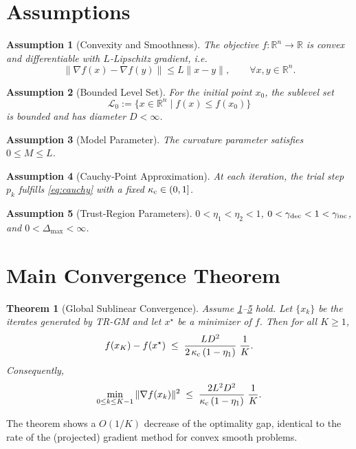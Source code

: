 \documentclass{article}
\newtheorem{theorem}{Theorem}
\newtheorem{assumption}{Assumption}
\newcommand{\R}{\mathbb{R}}
\begin{document}
\section*{Assumptions}
\begin{assumption}[Convexity and Smoothness]
\label{ass:convex}
The objective $f:\R^n\to\R$ is convex and differentiable with $L$‑Lipschitz gradient, i.e.
\[
\|\nabla f(x)-\nabla f(y)\|\le L\|x-y\|,\qquad \forall x,y\in\R^n .
\]
\end{assumption}
\begin{assumption}[Bounded Level Set]
\label{ass:bounded}
For the initial point $x_0$, the sublevel set 
\[
\mathcal{L}_0:=\{x\in\R^n\mid f(x)\le f(x_0)\}
\]
is bounded and has diameter $D<\infty$.
\end{assumption}
\begin{assumption}[Model Parameter]
\label{ass:M}
The curvature parameter satisfies $0\le M\le L$.
\end{assumption}
\begin{assumption}[Cauchy‑Point Approximation]
\label{ass:cauchy}
At each iteration, the trial step $p_k$ fulfills \eqref{eq:cauchy} with a fixed $\kappa_{\rm c}\in(0,1]$.
\end{assumption}
\begin{assumption}[Trust‑Region Parameters]
\label{ass:trparams}
$0<\eta_1<\eta_2<1$, $0<\gamma_{\rm dec}<1<\gamma_{\rm inc}$, and $0<\Delta_{\max}<\infty$.
\end{assumption}

\section*{Main Convergence Theorem}
\begin{theorem}[Global Sublinear Convergence]
\label{thm:conv}
Assume \ref{ass:convex}–\ref{ass:trparams} hold. Let $\{x_k\}$ be the iterates generated by TR‑GM and let $x^\star$ be a minimizer of $f$. Then for all $K\ge 1$,
\[
f(x_K)-f(x^\star)\;\le\;
\frac{L D^2}{2\,\kappa_{\rm c}\,(1-\eta_1)}\;\frac{1}{K}.
\]
Consequently,
\[
\min_{0\le k\le K-1}\|\nabla f(x_k)\|^2\;\le\;
\frac{2L^2 D^2}{\kappa_{\rm c}\,(1-\eta_1)}\;\frac{1}{K}.
\]
\end{theorem}
The theorem shows a $O(1/K)$ decrease of the optimality gap, identical to the rate of the (projected) gradient method for convex smooth problems.
\end{document}
